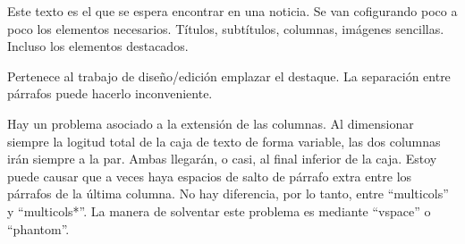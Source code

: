 Este texto es el que se espera encontrar en una noticia. Se van cofigurando poco a poco los elementos necesarios. Títulos, subtítulos, columnas, imágenes sencillas. Incluso los elementos destacados.


Pertenece al trabajo de diseño/edición emplazar el destaque. La separación entre párrafos puede hacerlo inconveniente.

Hay un problema asociado a la extensión de las columnas. Al dimensionar siempre la logitud total de la caja de texto de forma variable, las dos columnas irán siempre a la par. Ambas llegarán, o casi, al final inferior de la caja. Estoy puede causar que a veces haya espacios de salto de párrafo extra entre los párrafos de la última columna. No hay diferencia, por lo tanto, entre \enquote{multicols} y \enquote{multicols*}. La manera de solventar este problema es mediante \enquote{vspace} o \enquote{phantom}.